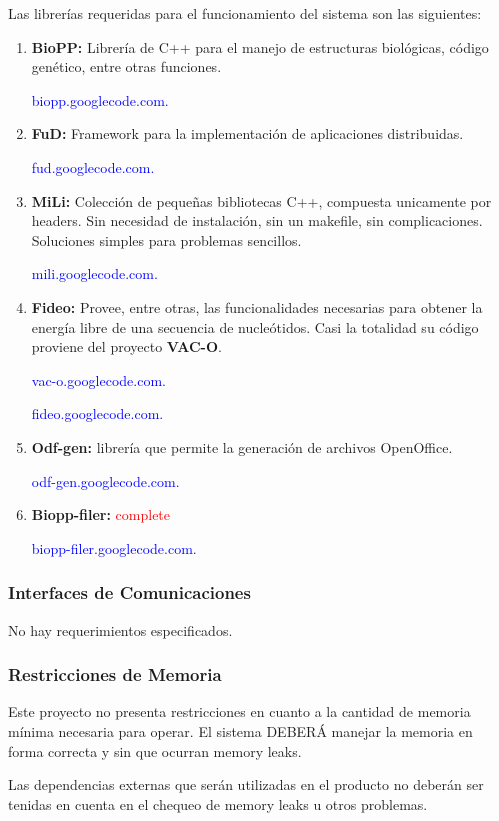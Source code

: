 \documentclass[12pt,a4paper,spanish]{article}
\begin{document}
		\par Las librerías requeridas para el funcionamiento del sistema son las siguientes:
		\begin{enumerate} 		
			\item \textbf{BioPP:} Librería de C++ para el manejo de estructuras biológicas, código
						genético, entre otras funciones. 
						\par \noindent \textcolor{blue}{biopp.googlecode.com.}

			\item \textbf{FuD:} Framework para la implementación de aplicaciones distribuidas. 
						\par \noindent \textcolor{blue}{fud.googlecode.com.}

			\item \textbf{MiLi:} Colección de pequeñas bibliotecas C++, compuesta unicamente por headers. Sin necesidad de instalación, sin un 									makefile, sin complicaciones. Soluciones simples para problemas sencillos.
						\par \noindent \textcolor{blue}{mili.googlecode.com.}

			\item \textbf{Fideo:} Provee, entre otras, las funcionalidades necesarias para obtener la energía libre de una secuencia de nucleótidos.
								  Casi la totalidad su código proviene del proyecto \textbf{VAC-O}.
						\par \noindent \textcolor{blue}{vac-o.googlecode.com.}
						\par \noindent \textcolor{blue}{fideo.googlecode.com.}  

			\item \textbf{Odf-gen:} librería que permite la generación de archivos OpenOffice.
						\par \noindent \textcolor{blue}{odf-gen.googlecode.com.}

			\item \textbf{Biopp-filer:} \textcolor{red}{complete}
						\par \noindent \textcolor{blue}{biopp-filer.googlecode.com.}
		\end{enumerate}

	\subsubsection{Interfaces de Comunicaciones}
		No hay requerimientos especificados.

	\subsubsection{Restricciones de Memoria}	
		\par Este proyecto no presenta restricciones en cuanto a la cantidad de memoria mínima necesaria para operar. El sistema DEBERÁ manejar la memoria 			en forma correcta y sin que ocurran memory leaks.
		\par Las dependencias externas que serán utilizadas en el producto no deberán ser tenidas en cuenta en el chequeo 
		de memory leaks u otros problemas.
		
\end{document}
